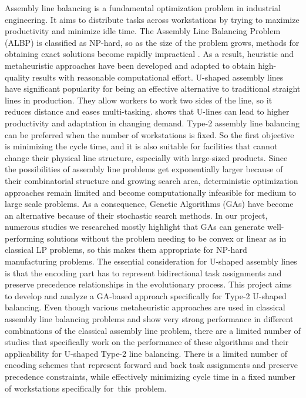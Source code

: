 \documentclass[12pt,a4paper]{article}
\begin{document}
Assembly line balancing is a fundamental optimization problem in industrial engineering. It aims to distribute tasks across workstations by trying to maximize productivity and minimize idle time. The Assembly Line Balancing Problem (ALBP) is classified as NP-hard, so as the size of the problem grows, methods for obtaining exact solutions become rapidly impractical \cite{becker_scholl_2006_generalized_survey}. As a result, heuristic and metaheuristic approaches have been developed and adapted to obtain high-quality results with reasonable computational effort.
U-shaped assembly lines have significant popularity for being an effective alternative to traditional straight lines in production. They allow workers to work two sides of the line, so it reduces distance and eases multi-tasking.\cite{miltenburg_2001} shows that U-lines can lead to higher productivity and adaptation in changing demand. Type-2 assembly line balancing can be preferred when the number of workstations is fixed. So the first objective is minimizing the cycle time, and it is also suitable for facilities that cannot change their physical line structure, especially with large-sized products\cite{boysen_fliedner_scholl_2007}.
Since the possibilities of assembly line problems get exponentially larger because of their combinatorial structure and growing search area, deterministic optimization approaches remain limited and become computationally infeasible for medium to large scale problems. As a consequence, Genetic Algorithms (GAs) have become an alternative because of their stochastic search methods. In our project, numerous studies we researched mostly highlight that GAs can generate well-performing solutions without the problem needing to be convex or linear as in classical LP problems, so this makes them appropriate for NP-hard manufacturing problems. The essential consideration for U-shaped assembly lines is that the encoding part has to represent bidirectional task assignments and preserve precedence relationships in the evolutionary process.
This project aims to develop and analyze a GA-based approach specifically for Type-2 U-shaped balancing. Even though various metaheuristic approaches are used in classical assembly line balancing problems and show very strong performance in different combinations of the classical assembly line problem, there are a limited number of studies that specifically work on the performance of these algorithms and their applicability for U-shaped Type-2 line balancing. There is a limited number of encoding schemes that represent forward and back task assignments and preserve precedence constraints, while effectively minimizing cycle time in a fixed number of workstations specifically for this problem.
\end{document}
